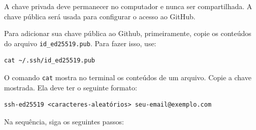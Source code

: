A chave privada deve permanecer no computador e nunca ser compartilhada. A chave pública será usada para configurar o acesso ao GitHub.

Para adicionar sua chave pública ao Github, primeiramente, copie os conteúdos do arquivo \texttt{id\_ed25519.pub}. Para fazer isso, use:

    \begin{lstlisting}[style=shellstyle]
cat ~/.ssh/id_ed25519.pub
\end{lstlisting}

O comando \texttt{cat} mostra no terminal os conteúdos de um arquivo. Copie a chave mostrada. Ela deve ter o seguinte formato:

    \begin{lstlisting}[style=shellstyle]
ssh-ed25519 <caracteres-aleatórios> seu-email@exemplo.com
\end{lstlisting}

Na sequência, siga os seguintes passos:

